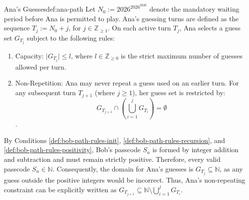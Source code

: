 \begin{definition}{Ana's Guesses}{def:ana-path}
Let $N_0 := 2026^{2026^{2026}}$ denote the mandatory waiting period before Ana is permitted to play. Ana's guessing turns are defined as the sequence $T_j := N_0 + j$, for $j \in \mathbb{Z}_{\ge 1}$. On each active turn $T_j$, Ana selects a guess set $G_{T_j}$ subject to the following rules: 

\begin{enumerate}[label=A\arabic*,ref=A\arabic*] 
\item \label{def:ana-guesses-rules-Capacity} Capacity: $\vert{}G_{T_j}\vert{} \le l$, where $l \in \mathbb{Z}_{\ge 0}$ is the strict maximum number of guesses allowed per turn. 

\item \label{def:ana-guesses-rules-non-repetition} Non-Repetition: Ana may never repeat a guess used on an earlier turn. For any subsequent turn $T_{j+1}$ (where $j \ge 1$), her guess set is restricted by:
  $$G_{T_{j+1}} \cap \left( \bigcup_{i=1}^{j} G_{T_i} \right) = \emptyset$$.
\end{enumerate}
\end{definition}

\begin{remark}\label{remark:ana-rules-domain-of-guesses} 
By Conditions \ref{def:bob-path-rules-init}, \ref{def:bob-path-rules-recursion}, and \ref{def:bob-path-rules-positivity}, Bob's passcode $S_n$ is formed by integer addition and subtraction and must remain strictly positive. Therefore, every valid passcode $S_n \in \mathbb{N}$. Consequently, the domain for Ana's guesses is $G_{T_j} \subseteq \mathbb{N}$, as any guess outside the positive integers would be incorrect. Thus, Ana's non-repeating constraint can be explicitly written as $G_{T_{j+1}} \subseteq \mathbb{N} \setminus \bigcup_{i=1}^{j} G_{T_i}$. 
\end{remark}

